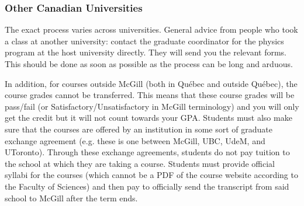 \subsubsection{Other Canadian Universities}
The exact process varies across universities. General advice from people who took a class at another university: contact the graduate coordinator for the physics program at the host university directly. They will send you the relevant forms. This should be done as soon as possible as the process can be long and arduous. 

In addition, for courses outside McGill (both in Québec and outside Québec), the course grades cannot be transferred. This means that these course grades will be pass/fail (or Satisfactory/Unsatisfactory in McGill terminology) and you will only get the credit but it will not count towards your GPA. Students must also make sure that the courses are offered by an institution in some sort of graduate exchange agreement (e.g. these is one between McGill, UBC, UdeM, and UToronto). Through these exchange agreements, students do not pay tuition to the school at which they are taking a course. Students must provide official syllabi for the courses (which cannot be a PDF of the course website according to the Faculty of Sciences) and then pay to officially send the transcript from said school to McGill after the term ends. 


     
        
